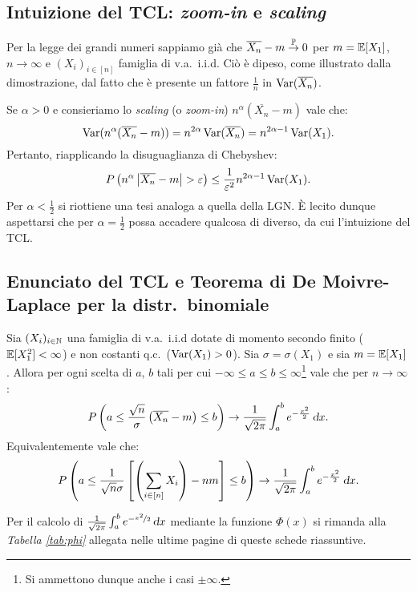 \begin{multicols*}{2}
\subsection{Intuizione del TCL: \textit{zoom-in} e \textit{scaling}}
Per la legge dei grandi numeri sappiamo già che
$\overline{X_n} - m \overset{\mathbb{P}}{\to} 0$ per $m = \mathbb{E}[X_1]$, $n \to \infty$ e
$(X_i)_{i \in [n]}$ famiglia di v.a.~i.i.d. Ciò è dipeso, come illustrato dalla dimostrazione, dal fatto che è presente un fattore $\frac{1}{n}$ in $\operatorname{Var}(\overline{X_n})$.
\smallskip


Se $\alpha > 0$ e consieriamo lo \textit{scaling} (o \textit{zoom-in}) $n^\alpha (\overline{X_n} - m)$
vale che:
\[
    \operatorname{Var}(n^\alpha (\overline{X_n} - m)) = n^{2\alpha} \operatorname{Var}(\overline{X_n}) = n^{2\alpha - 1} \operatorname{Var}(X_1). 
\]
Pertanto, riapplicando la disuguaglianza di Chebyshev:
\[
    P\left(n^\alpha \left\lvert \overline{X_n} - m \right\rvert > \varepsilon\right) \leq \frac{1}{\varepsilon^2} n^{2\alpha - 1} \operatorname{Var}(X_1).
\]
Per $\alpha < \frac{1}{2}$ si riottiene una tesi analoga a quella della LGN. È
lecito dunque aspettarsi che per $\alpha = \frac{1}{2}$ possa accadere qualcosa
di diverso, da cui l'intuizione del TCL.

\subsection{Enunciato del TCL e Teorema di De Moivre-Laplace per la distr.~binomiale}
\begin{theorem}
    Sia $(X_i)_{i \in \mathbb{N}}$ una famiglia di v.a.~i.i.d dotate di momento secondo
    finito ($\mathbb{E}[X_1^2] < \infty$) e non costanti q.c.~($\operatorname{Var}(X_1) > 0$). Sia
    $\sigma = \sigma(X_1)$ e sia $m = \mathbb{E}[X_1]$. Allora per ogni scelta di $a$, $b$
    tali per cui $-\infty \leq a \leq b \leq \infty$\footnote{
        Si ammettono dunque anche i casi $\pm \infty$.
    } vale che per $n \to \infty$:
    \[
        P\left(a \leq \frac{\sqrt{n}}{\sigma} \left(\overline{X_n} - m\right) \leq b\right) \to \frac{1}{\sqrt{2\pi}}\int_a^b e^{-\frac{x^2}{2}} \dx. 
    \]
    Equivalentemente vale che:
    \[
        P\left(a \leq \frac{1}{\sqrt{n}\sigma} \left[\left(\sum_{i \in [n]} X_i\right) - nm\right] \leq b\right) \to \frac{1}{\sqrt{2\pi}}\int_a^b e^{-\frac{x^2}{2}} \dx. 
    \]
\end{theorem}

\begin{warn}
    Per il calcolo di $\frac{1}{\sqrt{2\pi}}\int_a^b e^{-\nicefrac{x^2}{2}} \dx$ mediante
    la funzione $\Phi(x)$ si rimanda
    alla \textit{Tabella \ref{tab:phi}} allegata nelle ultime pagine di queste schede riassuntive.
\end{warn}


\end{multicols*}
